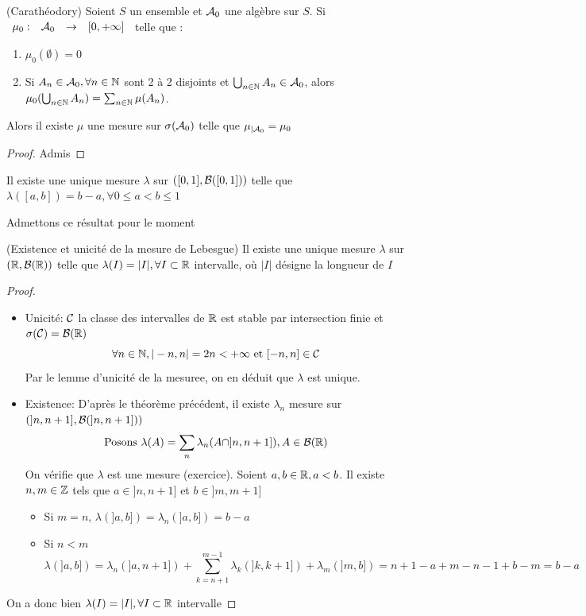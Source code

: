 \documentclass[]{report}
\begin{document}
    \begin{tm}{}{(Carathéodory)}
        Soient $S$ un ensemble et $\mathcal{A}_0$ une algèbre sur $S$. Si $\begin{array}{ccccc} \mu_0 : & \mathcal{A}_0 & \to & [0,+\infty] \end{array}$ telle que :
        \begin{enumerate}
            \item $\mu_0(\emptyset)=0$
            \item Si $A_n\in\mathcal{A}_0,\forall n\in\mathbb{N}$ sont 2 à 2 disjoints et $\bigcup_{n\in\mathbb{N}}A_n\in\mathcal{A}_0$, alors $\mu_0(\bigcup_{n\in\mathbb{N}}A_n)=\sum_{n\in\mathbb{N}}\mu(A_n)$.
        \end{enumerate}
        Alors il existe $\mu$ une mesure sur $\sigma(\mathcal{A}_0)$ telle que $\mu_{|\mathcal{A}_0}=\mu_0$
    \end{tm}

    \begin{proof}{}{}
        Admis
    \end{proof}

    \begin{tm}{}{}
        Il existe une unique mesure $\lambda$ sur $([0,1],\mathcal{B}([0,1]))$ telle que $\lambda([a,b])=b-a,\forall 0\le a<b\le 1$
    \end{tm}

Admettons ce résultat pour le moment

    \begin{cor}{}{(Existence et unicité de la mesure de Lebesgue)}
        Il existe une unique mesure $\lambda$ sur $(\mathbb{R},\mathcal{B}(\mathbb{R}))$ telle que $\lambda(I)=|I|,\forall I\subset \mathbb{R}$ intervalle, où $|I|$ désigne la longueur de $I$
    \end{cor}

    \begin{proof}{}{}
        \begin{itemize}
            \item Unicité: $\mathcal{C}$ la classe des intervalles de $\mathbb{R}$ est stable par intersection finie et $\sigma(\mathcal{C})=\mathcal{B}(\mathbb{R})$
            \[\forall n\in\mathbb{N},|-n,n|=2n<+\infty\text{ et }[-n,n]\in\mathcal{C}\]
            Par le lemme d'unicité de la mesuree, on en déduit que $\lambda$ est unique.
            \item Existence: D'après le théorème précédent, il existe $\lambda_n$ mesure sur $(]n,n+1],\mathcal{B}(]n,n+1]))$\\
            \[\text{Posons }\lambda(A)=\sum_{n} \lambda_n(A\cap]n,n+1]),A\in\mathcal{B}(\mathbb{R})\]
            On vérifie que $\lambda$ est une mesure (exercice). Soient $a,b\in\mathbb{R},a<b$. Il existe $n,m\in\mathbb{Z}$ tels que $a\in]n,n+1]$ et $b\in]m,m+1]$
            \begin{itemize}
                \item Si $m=n$, $\lambda(]a,b])=\lambda_n(]a,b])=b-a$
                \item Si $n<m$
                \[\lambda(]a,b])=\lambda_n(]a,n+1])+\sum_{k=n+1}^{m-1}\lambda_k(]k,k+1])+\lambda_m(]m,b])=n+1-a+m-n-1+b-m=b-a\]
            \end{itemize}
        \end{itemize}
        On a donc bien $\lambda(I)=|I|,\forall I\subset\mathbb{R}$ intervalle
    \end{proof}
\end{document}

